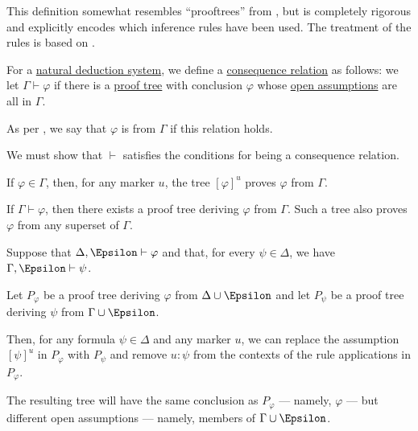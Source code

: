\begin{comments}
  \item This definition somewhat resembles \enquote{prooftrees} from , but is completely rigorous and explicitly encodes which inference rules have been used. The treatment of the rules is based on .
\end{comments}

\begin{definition}\label{def:natural_deduction_entailment}
  For a \hyperref[def:abstract_natural_deduction_system]{natural deduction system}, we define a \hyperref[def:consequence_relation]{consequence relation} as follows: we let \( \Gamma \vdash \varphi \) if there is a \hyperref[def:natural_deduction_proof_tree]{proof tree} with conclusion \( \varphi \) whose \hyperref[def:natural_deduction_proof_tree/context]{open assumptions} are all in \( \Gamma \).

  As per , we say that \( \varphi \) is  from \( \Gamma \) if this relation holds.
\end{definition}
\begin{defproof}
  We must show that \( {\vdash} \) satisfies the conditions for being a consequence relation.

   If \( \varphi \in \Gamma \), then, for any marker \( u \), the tree \( [\varphi]^u \) proves \( \varphi \) from \( \Gamma \).

   If \( \Gamma \vdash \varphi \), then there exists a proof tree deriving \( \varphi \) from \( \Gamma \). Such a tree also proves \( \varphi \) from any superset of \( \Gamma \).

   Suppose that \( \Delta, \Epsilon \vdash \varphi \) and that, for every \( \psi \in \Delta \), we have \( \Gamma, \Epsilon \vdash \psi \).

  Let \( P_\varphi \) be a proof tree deriving \( \varphi \) from \( \Delta \cup \Epsilon \) and let \( P_\psi \) be a proof tree deriving \( \psi \) from \( \Gamma \cup \Epsilon \).

  Then, for any formula \( \psi \in \Delta \) and any marker \( u \), we can replace the assumption \( [\psi]^u \) in \( P_\varphi \) with \( P_\psi \) and remove \( u: \psi \) from the contexts of the rule applications in \( P_\varphi \).

  The resulting tree will have the same conclusion as \( P_\varphi \) --- namely, \( \varphi \) --- but different open assumptions --- namely, members of \( \Gamma \cup \Epsilon \).
\end{defproof}

